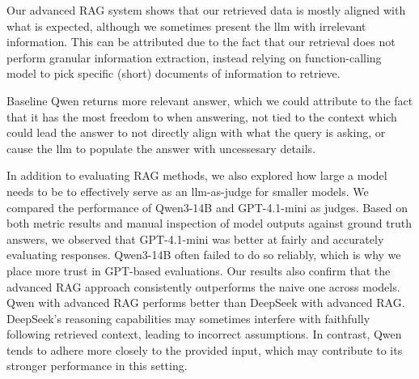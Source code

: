 \documentclass[fleqn,moreauthors,10pt]{ds_report}
\begin{document}
Our advanced RAG system shows that our retrieved data is mostly aligned with what is expected, although we sometimes present the \ac{llm} with irrelevant information. This can be attributed due to the fact that our retrieval does not perform granular information extraction, instead relying on function-calling model to pick specific (short) documents of information to retrieve.

Baseline Qwen returns more relevant answer, which we could attribute to the fact that it has the most freedom to when answering, not tied to the context which could lead the answer to not directly align with what the query is asking, or cause the \ac{llm} to populate the answer with uncessesary details.

In addition to evaluating RAG methods, we also explored how large a model needs to be to effectively serve as an \ac{llm}-as-judge for smaller models. We compared the performance of Qwen3-14B and GPT-4.1-mini as judges. Based on both metric results and manual inspection of model outputs against ground truth answers, we observed that GPT-4.1-mini was better at fairly and accurately evaluating responses. Qwen3-14B often failed to do so reliably, which is why we place more trust in GPT-based evaluations. Our results also confirm that the advanced RAG approach consistently outperforms the naive one across models. Qwen with advanced RAG performs better than DeepSeek with advanced RAG. DeepSeek's reasoning capabilities may sometimes interfere with faithfully following retrieved context, leading to incorrect assumptions. In contrast, Qwen tends to adhere more closely to the provided input, which may contribute to its stronger performance in this setting.




\end{document}
